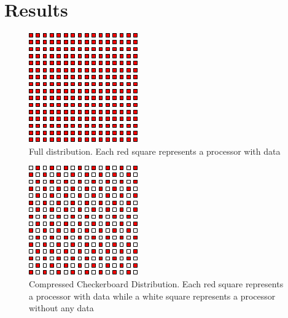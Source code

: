 \section{Results}
\label{sec:results}


\begin{figure}
\begin{center}
\includegraphics[keepaspectratio]{full_16_16}
  \caption{Full distribution. Each red square represents a processor with data}
  \label{fig:full_4096}
\end{center}
\end{figure}

\begin{figure}
\begin{center}  
\includegraphics[keepaspectratio]{checkerboard_16_16}
  \caption{Compressed Checkerboard Distribution. Each red square represents a processor with data while a white square represents a processor without any data}
  \label{fig:checkerboard_4096}
\end{center}
\end{figure}

